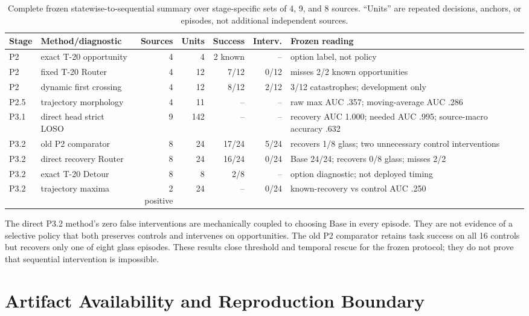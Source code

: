 \begin{table}[H]
\centering
\scriptsize
\begin{tabularx}{\linewidth}{@{}l l r r r r Y@{}}
\toprule
Stage & Method/diagnostic & Sources & Units & Success & Interv. & Frozen reading \\
\midrule
P2 & exact T-20 opportunity & 4 & 4 & 2 known & -- & option label, not policy \\
P2 & fixed T-20 Router & 4 & 12 & 7/12 & 0/12 & misses 2/2 known opportunities \\
P2 & dynamic first crossing & 4 & 12 & 8/12 & 2/12 & 3/12 catastrophes; development only \\
P2.5 & trajectory morphology & 4 & 11 & -- & -- & raw max AUC .357; moving-average AUC .286 \\
P3.1 & direct head strict LOSO & 9 & 142 & -- & -- & recovery AUC 1.000; needed AUC .995; source-macro accuracy .632 \\
P3.2 & old P2 comparator & 8 & 24 & 17/24 & 5/24 & recovers 1/8 glass; two unnecessary control interventions \\
P3.2 & direct recovery Router & 8 & 24 & 16/24 & 0/24 & Base 24/24; recovers 0/8 glass; misses 2/2 \\
P3.2 & exact T-20 Detour & 8 & 8 & 2/8 & -- & option diagnostic; not deployed timing \\
P3.2 & trajectory maxima & 2 positive & 24 & -- & 0/24 & known-recovery vs control AUC .250 \\
\bottomrule
\end{tabularx}
\caption{Complete frozen statewise-to-sequential summary over stage-specific
sets of 4, 9, and 8 sources. ``Units'' are
repeated decisions, anchors, or episodes, not additional independent sources.}
\label{tab:sequential-full}
\end{table}

The direct P3.2 method's zero false interventions are mechanically coupled to
choosing Base in every episode. They are not evidence of a selective policy
that both preserves controls and intervenes on opportunities. The old P2
comparator retains task success on all 16 controls but recovers only one of
eight glass episodes. These results close threshold and temporal rescue for the
frozen protocol; they do not prove that sequential intervention is impossible.

\section{Artifact Availability and Reproduction Boundary}
\label{app:availability}

